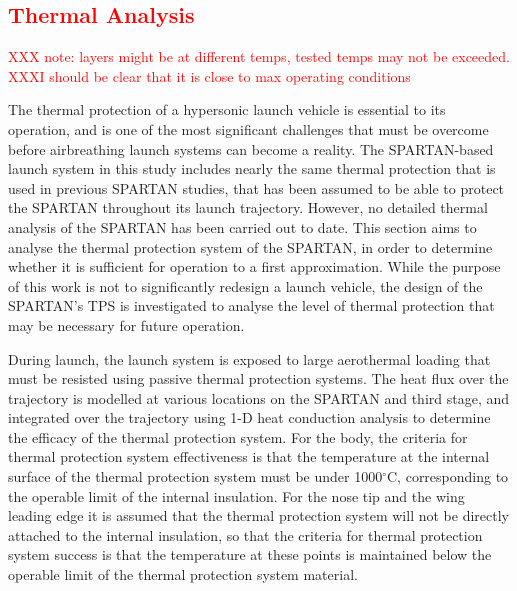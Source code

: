 
\textcolor{red}{
	\chapter{Thermal Analysis}
}
\textcolor{red}{XXX note: layers might be at different temps, tested temps may not be exceeded.}
\textcolor{red}{XXXI should be clear that it is close to max operating conditions}

The thermal protection of a hypersonic launch vehicle is essential to its operation, and is one of the most significant challenges that must be overcome before airbreathing launch systems can become a reality. The SPARTAN-based launch system in this study includes nearly the same thermal protection that is used in previous SPARTAN studies, that has been assumed to be able to protect the SPARTAN throughout its launch trajectory\cite{Preller2018a}. However, no detailed thermal analysis of the SPARTAN has been carried out to date. This section aims to analyse the thermal protection system of the SPARTAN, in order to determine whether it is sufficient for operation to a first approximation. While the purpose of this work is not to significantly redesign a launch vehicle, the design of the SPARTAN's TPS is investigated to analyse the level of thermal protection that may be necessary for future operation. 



During launch, the launch system is exposed to large aerothermal loading that must be resisted using passive thermal protection systems. The heat flux over the trajectory is modelled at various locations on the SPARTAN and third stage, and integrated over the trajectory using 1-D heat conduction analysis to determine the efficacy of the thermal protection system. For the body, the criteria for thermal protection system effectiveness is that the temperature at the internal surface of the thermal protection system must be under 1000$^\circ$C, corresponding to the operable limit of the internal insulation. For the nose tip and the wing leading edge it is assumed that the thermal protection system will not be directly attached to the internal insulation, so that the criteria for thermal protection system success is that the temperature at these points is maintained below the operable limit of the thermal protection system material. 

